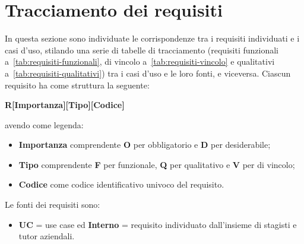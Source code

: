 \section{Tracciamento dei requisiti}\label{sec:tracciamento-requisiti}

In questa sezione sono individuate le corrispondenze tra i requisiti individuati e i casi d'uso, stilando una serie di tabelle di tracciamento 
(requisiti funzionali a~\ref{tab:requisiti-funzionali}, di vincolo a~\ref{tab:requisiti-vincolo} e qualitativi a~\ref{tab:requisiti-qualitativi}) tra i casi d'uso e le loro fonti, e viceversa.
Ciascun requisito ha come struttura la seguente:
\begin{center}
  \textbf{R[Importanza][Tipo][Codice]}
\end{center}
avendo come legenda:
\begin{itemize}
\item \textbf{Importanza} comprendente \textbf{O} per obbligatorio e \textbf{D} per desiderabile;
\item \textbf{Tipo} comprendente \textbf{F} per funzionale, \textbf{Q} per qualitativo e \textbf{V} per di vincolo;
\item \textbf{Codice} come codice identificativo univoco del requisito.
\end{itemize}
Le fonti dei requisiti sono:
\begin{itemize}
  \item \textbf{UC} = use case ed \textbf{Interno} = requisito individuato dall'insieme di stagisti e tutor aziendali.
\end{itemize}

\renewcommand{\arraystretch}{1.1}

